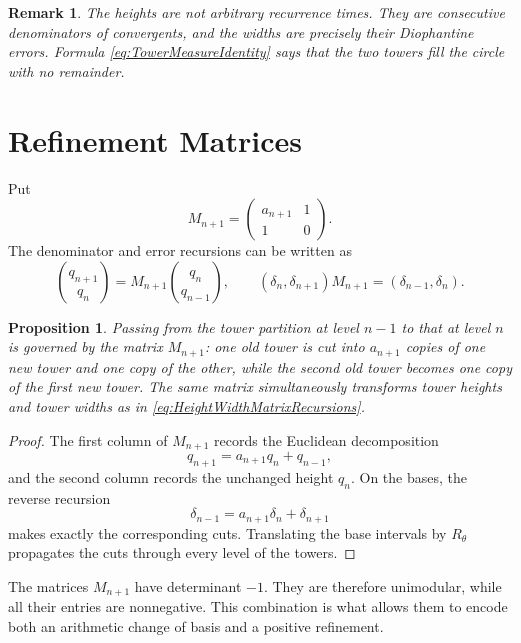 \documentclass{book}
\newtheorem{proposition}[definition]{Proposition}
\newtheorem{remark}[definition]{Remark}
\begin{document}
\begin{remark}
  The heights are not arbitrary recurrence times.  They are consecutive
  denominators of convergents, and the widths are precisely their
  Diophantine errors.  Formula \eqref{eq:TowerMeasureIdentity} says that the
  two towers fill the circle with no remainder.
\end{remark}

\section{Refinement Matrices}

Put
\begin{equation}\label{eq:ContinuedFractionIncidenceMatrix}
  M_{n+1}=
  \begin{pmatrix}
    a_{n+1}&1\\
    1&0
  \end{pmatrix}.
\end{equation}
The denominator and error recursions can be written as
\begin{equation}\label{eq:HeightWidthMatrixRecursions}
  \binom{q_{n+1}}{q_n}
  =M_{n+1}\binom{q_n}{q_{n-1}},
  \qquad
  (\delta_n,\delta_{n+1})M_{n+1}
  =(\delta_{n-1},\delta_n).
\end{equation}

\begin{proposition}\label{proposition:TowerRefinementMatrix}
  Passing from the tower partition at level \(n-1\) to that at level \(n\)
  is governed by the matrix \(M_{n+1}\): one old tower is cut into
  \(a_{n+1}\) copies of one new tower and one copy of the other, while the
  second old tower becomes one copy of the first new tower.  The same
  matrix simultaneously transforms tower heights and tower widths as in
  \eqref{eq:HeightWidthMatrixRecursions}.
\end{proposition}
\begin{proof}
  The first column of \(M_{n+1}\) records the Euclidean decomposition
  \[
    q_{n+1}=a_{n+1}q_n+q_{n-1},
  \]
  and the second column records the unchanged height \(q_n\).  On the
  bases, the reverse recursion
  \[
    \delta_{n-1}=a_{n+1}\delta_n+\delta_{n+1}
  \]
  makes exactly the corresponding cuts.  Translating the base intervals by
  \(R_\theta\) propagates the cuts through every level of the towers.
\end{proof}

The matrices \(M_{n+1}\) have determinant \(-1\).  They are therefore
unimodular, while all their entries are nonnegative.  This combination is
what allows them to encode both an arithmetic change of basis and a
positive refinement.
\end{document}
